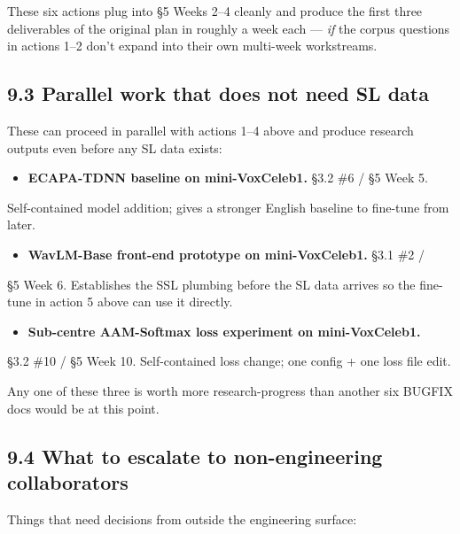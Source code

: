 \documentclass[10pt,a4paper]{article}
\begin{document}
These six actions plug into §5 Weeks 2--4 cleanly and produce the first three deliverables of the original plan in roughly a week each --- \textit{if} the corpus questions in actions 1--2 don't expand into their own multi-week workstreams.

\subsection*{9.3 Parallel work that does not need SL data}

These can proceed in parallel with actions 1--4 above and produce research outputs even before any SL data exists:

\begin{itemize}[leftmargin=*,itemsep=2pt]
  \item \textbf{ECAPA-TDNN baseline on mini-VoxCeleb1.} §3.2 \#6 / §5 Week 5.
\end{itemize}
Self-contained model addition; gives a stronger English baseline to fine-tune from later.
\begin{itemize}[leftmargin=*,itemsep=2pt]
  \item \textbf{WavLM-Base front-end prototype on mini-VoxCeleb1.} §3.1 \#2 /
\end{itemize}
§5 Week 6. Establishes the SSL plumbing before the SL data arrives so the fine-tune in action 5 above can use it directly.
\begin{itemize}[leftmargin=*,itemsep=2pt]
  \item \textbf{Sub-centre AAM-Softmax loss experiment on mini-VoxCeleb1.}
\end{itemize}
§3.2 \#10 / §5 Week 10. Self-contained loss change; one config + one loss file edit.

Any one of these three is worth more research-progress than another six BUGFIX docs would be at this point.

\subsection*{9.4 What to escalate to non-engineering collaborators}

Things that need decisions from outside the engineering surface:
\end{document}
